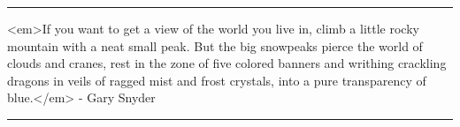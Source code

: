  \par\noindent\rule{\textwidth}{0.4pt}
<em>If you want to get a view 
of the world you live in, climb a little rocky mountain with 
a neat small peak. But the big snowpeaks pierce the world of clouds and 
cranes, rest in the zone of five colored banners and writhing crackling 
dragons in veils of ragged mist and frost crystals, into a pure transparency 
of blue.</em> - Gary Snyder

\par\noindent\rule{\textwidth}{0.4pt}

